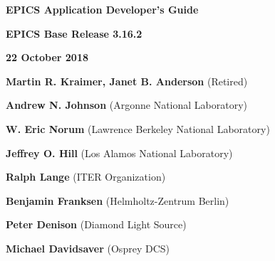 \def\divider{\par
  \vskip 0.5in
  \hrulefill
  \vskip 0.5in
}

\divider

\Huge \textbf{EPICS Application Developer's Guide}

\vskip 0.5in

\Large \textbf{EPICS Base Release 3.16.2}

\textbf{22 October 2018}

\vskip 0.5in

\normalsize
\textbf{Martin R. Kraimer, Janet B. Anderson} (Retired)

\textbf{Andrew N. Johnson} (Argonne National Laboratory)

\textbf{W. Eric Norum} (Lawrence Berkeley National Laboratory)

\textbf{Jeffrey O. Hill} (Los Alamos National Laboratory)

\textbf{Ralph Lange} (ITER Organization)

\textbf{Benjamin Franksen} (Helmholtz-Zentrum Berlin)

\textbf{Peter Denison} (Diamond Light Source)

\textbf{Michael Davidsaver} (Osprey DCS)

\divider
